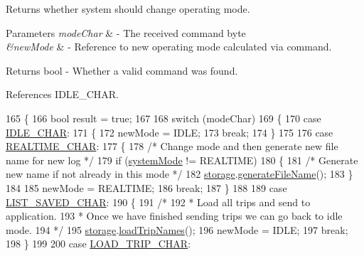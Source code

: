 Returns whether system should change operating mode. 


\begin{DoxyParams}{Parameters}
{\em mode\+Char} & -\/ The received command byte \\
\hline
{\em \&new\+Mode} & -\/ Reference to new operating mode calculated via command. \\
\hline
\end{DoxyParams}
\begin{DoxyReturn}{Returns}
bool -\/ Whether a valid command was found. 
\end{DoxyReturn}


References I\+D\+L\+E\+\_\+\+C\+H\+AR.


\begin{DoxyCode}
165 \{
166   \textcolor{keywordtype}{bool} result = \textcolor{keyword}{true};
167 
168   \textcolor{keywordflow}{switch} (modeChar)
169   \{
170     \textcolor{keywordflow}{case} \hyperlink{logging-device_8ino_ad7f0721d7856c100a69be7fa82e2865b}{IDLE\_CHAR}:
171     \{
172       newMode = IDLE;
173       \textcolor{keywordflow}{break};
174     \}
175 
176     \textcolor{keywordflow}{case} \hyperlink{logging-device_8ino_a911a5839eebf5e3d5927f4f77e9bfb62}{REALTIME\_CHAR}:
177     \{
178       \textcolor{comment}{/* Change mode and then generate new file name for new log */}
179       \textcolor{keywordflow}{if} (\hyperlink{logging-device_8ino_a13a2ecbcf455940dd240e54e9e39cf7a}{systemMode} != REALTIME)
180       \{
181         \textcolor{comment}{/* Generate new name if not already in this mode */}
182         \hyperlink{logging-device_8ino_a40059244119c00baa1b841119cfd1b2e}{storage}.\hyperlink{class_storage_a571ce9630665d9407ffbaeff55c47b0a}{generateFileName}();
183       \}
184 
185       newMode = REALTIME;
186       \textcolor{keywordflow}{break};
187     \}
188 
189     \textcolor{keywordflow}{case} \hyperlink{logging-device_8ino_a4ffb22b7b0017657087830d24f68a323}{LIST\_SAVED\_CHAR}:
190     \{
191       \textcolor{comment}{/*}
192 \textcolor{comment}{       * Load all trips and send to application.}
193 \textcolor{comment}{       * Once we have finished sending trips we can go back to idle mode.}
194 \textcolor{comment}{       */}
195       \hyperlink{logging-device_8ino_a40059244119c00baa1b841119cfd1b2e}{storage}.\hyperlink{class_storage_a4831b2e8ecfa22da6971f5a8690cc4e3}{loadTripNames}();
196       newMode = IDLE;
197       \textcolor{keywordflow}{break};
198     \}
199 
200     \textcolor{keywordflow}{case} \hyperlink{logging-device_8ino_aa72e33a6bcfedf9118f573741b4e137b}{LOAD\_TRIP\_CHAR}:

\end{DoxyCode}
